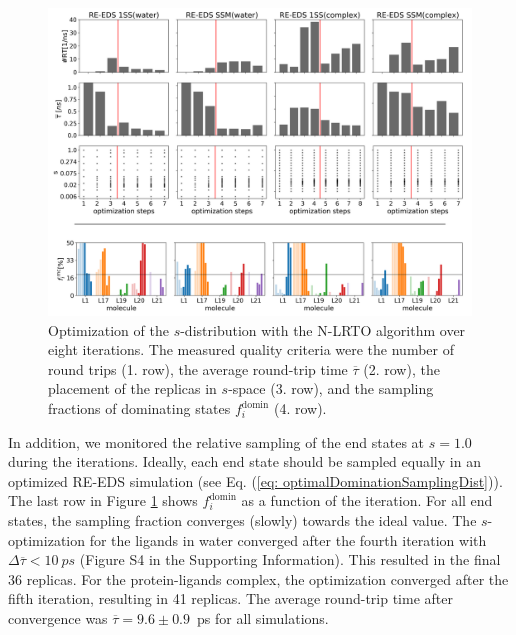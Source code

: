\begin{figure}[h]
	\centering
	\includegraphics[width=\textwidth]{fig/results/ringOpening/paramOptimization/S-optimization_ringOpening.png}
	\caption{Optimization of the $s$-distribution with the N-LRTO \cite{Sidler2017} algorithm over eight iterations. The measured quality criteria were the number of round trips (1. row), the average round-trip time $\overline{\tau}$ (2. row), the placement of the replicas in $s$-space (3. row), and the sampling fractions of dominating states $f_{i}^{\text{domin}}$ (4. row).}
	\label{fig: CHK1_RingOpening_sOptimization}
\end{figure}

In addition, we monitored the relative sampling of the end states at $s=1.0$ during the iterations.
Ideally, each end state should be sampled equally in an optimized RE-EDS simulation (see Eq. (\ref{eq: optimalDominationSamplingDist})).  The last row in Figure \ref{fig: CHK1_RingOpening_sOptimization} shows $f_{i}^{\text{domin}}$ as a function of the iteration. For all end states, the sampling fraction converges (slowly) towards the ideal value.
The $s$-optimization for the ligands in water converged after the fourth iteration with $\Delta \overline{\tau} < 10~ps$ (Figure S4 in the Supporting Information). %
This resulted in the final 36 replicas.
For the protein-ligands complex, the optimization converged after the fifth iteration, resulting in 41 replicas. 
The average round-trip time after convergence was $\overline{\tau} = 9.6 \pm 0.9$~ps for all simulations.

